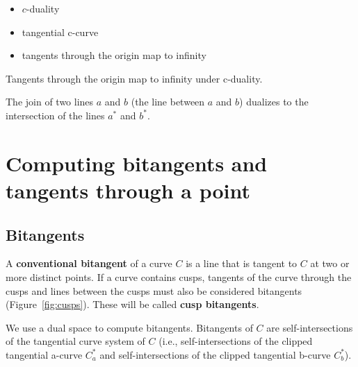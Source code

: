 \documentclass[12pt]{article}
\begin{document}
\begin{itemize}
\item	$c$-duality
\item	tangential c-curve
\item	tangents through the origin map to infinity
\end{itemize}

\begin{lemma}
\label{lem:cinfty}
Tangents through the origin map to infinity under c-duality.
\end{lemma}

\begin{lemma}
\label{lem:join}
The join of two lines $a$ and $b$ (the line between $a$ and $b$) 
dualizes to the intersection of the lines $a^*$ and $b^*$.
\end{lemma}

\clearpage


\section{Computing bitangents and tangents through a point}
\label{sec:bitang}

\subsection{Bitangents}

\begin{defn2}
\label{defn:bitang}
A {\bf conventional bitangent} of a curve $C$ is a line
that is tangent to $C$ at two or more distinct points.
If a curve contains cusps, tangents of the curve through the cusps
and lines between the cusps must also be considered bitangents
(Figure~\ref{fig:cusps}).
These will be called {\bf cusp bitangents}.
\end{defn2}


We use a dual space to compute bitangents.
Bitangents of $C$ are self-intersections of the tangential curve system of $C$
(i.e., self-intersections of the clipped tangential a-curve $C_a^*$
and self-intersections of the clipped tangential b-curve $C_b^*$).
\end{document}
